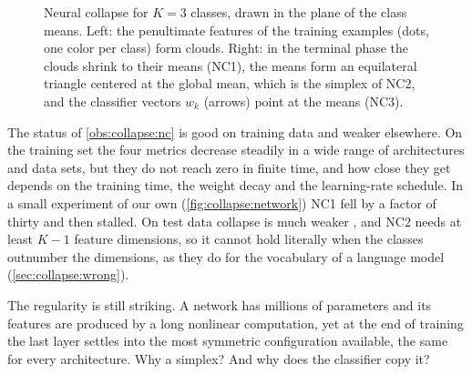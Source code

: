 \begin{refsection}
\begin{figure}[t]
\centering
{}
\caption{Neural collapse for $K=3$ classes, drawn in the plane of the class means. Left: the penultimate features of the training examples (dots, one color per class) form clouds. Right: in the terminal phase the clouds shrink to their means (NC1), the means form an equilateral triangle centered at the global mean, which is the simplex of NC2, and the classifier vectors $w_k$ (arrows) point at the means (NC3).}\label{fig:collapse:cartoon}
\end{figure}

The status of \cref{obs:collapse:nc} is good on training data and weaker elsewhere. On the training set the four metrics decrease steadily in a wide range of architectures and data sets, but they do not reach zero in finite time, and how close they get depends on the training time, the weight decay and the learning-rate schedule. In a small experiment of our own (\cref{fig:collapse:network}) NC1 fell by a factor of thirty and then stalled. On test data collapse is much weaker \parencite{HuiBelkinNakkiran2022}, and NC2 needs at least $K-1$ feature dimensions, so it cannot hold literally when the classes outnumber the dimensions, as they do for the vocabulary of a language model (\cref{sec:collapse:wrong}).

The regularity is still striking. A network has millions of parameters and its features are produced by a long nonlinear computation, yet at the end of training the last layer settles into the most symmetric configuration available, the same for every architecture. Why a simplex? And why does the classifier copy it?


\end{refsection}
